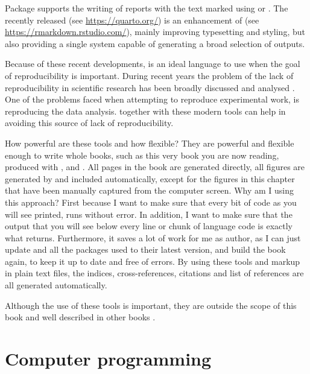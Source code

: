 \documentclass[krantz2]{krantz}\usepackage{knitr}
\begin{document}
Package  supports the writing of reports with the text marked using \Markdown or \Latex. The recently released \Quarto (see \url{https://quarto.org/}) is an enhancement of \Rmarkdown (see \url{https://rmarkdown.rstudio.com/}), mainly improving typesetting and styling, but also providing a single system capable of generating a broad selection of outputs.

Because of these recent developments, \Rlang is an ideal language to use when the goal of reproducibility is important. During recent years the problem of the lack of reproducibility in scientific research has been broadly discussed and analysed \autocite{Gandrud2015}. One of the problems faced when attempting to reproduce experimental work, is reproducing the data analysis. \Rlang together with these modern tools can help in avoiding this source of lack of reproducibility.

How powerful are these tools and how flexible? They are powerful and flexible enough to write whole books, such as this very book you are now reading, produced with \Rpgrm,  and \Latex. All pages in the book are generated directly, all figures are generated by \Rpgrm and included automatically, except for the figures in this chapter that have been manually captured from the computer screen. Why am I using this approach? First because I want to make sure that every bit of code as you will see printed, runs without error. In addition, I want to make sure that the output that you will see below every line or chunk of \Rlang language code is exactly what \Rpgrm returns. Furthermore, it saves a lot of work for me as author, as I can just update \Rpgrm and all the packages used to their latest version, and build the book again, to keep it up to date and free of errors. By using these tools and markup in plain text files, the indices, cross-references, citations and list of references are all generated automatically.

Although the use of these tools is important, they are outside the scope of this book and well described in other books \autocite{Gandrud2015,Xie2013}.

\section{Computer programming}
\end{document}
